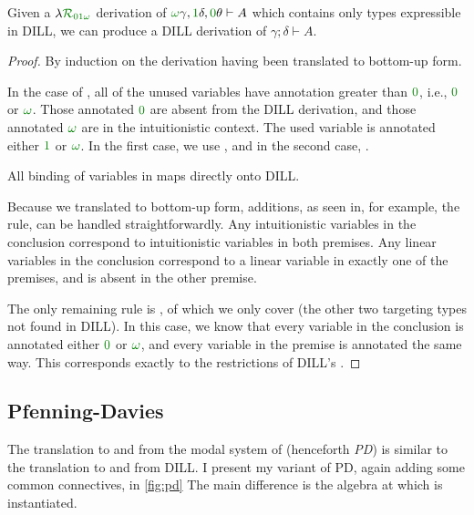 \begin{proposition}
  Given a $\name_{\instDILL}$ derivation of
  $\gr\omega\gamma, \gr1\delta,
  \gr0\theta \vdash A$ which contains only types expressible
  in DILL, we can produce a DILL derivation of $\gamma; \delta \vdash A$.
\end{proposition}
\begin{proof}
  By induction on the derivation having been translated to bottom-up form.

  In the case of , all of the unused variables have annotation
  greater than $\gr0$, i.e., $\gr0$ or $\gr\omega$.
  Those annotated $\gr0$ are absent from the DILL derivation, and those
  annotated $\gr\omega$ are in the intuitionistic context.
  The used variable is annotated either $\gr1$ or $\gr\omega$.
  In the first case, we use , and in the second case,
  .

  All binding of variables in \name{} maps directly onto DILL\@.

  Because we translated to bottom-up form, additions, as seen in, for example,
  the  rule, can be handled straightforwardly.
  Any intuitionistic variables in the conclusion correspond to intuitionistic
  variables in both premises.
  Any linear variables in the conclusion correspond to a linear variable in
  exactly one of the premises, and is absent in the other premise.

  The only remaining rule is , of which we only cover
   (the other two targeting types not found
  in DILL).
  In this case, we know that every variable in the conclusion is annotated
  either $\gr0$ or $\gr\omega$, and every variable in the premise is
  annotated the same way.
  This corresponds exactly to the restrictions of DILL's .
\end{proof}

\subsection{Pfenning-Davies}\label{sec:trans-pd}

The translation to and from the modal system of \citet{judgmental}
(henceforth \emph{PD}) is similar to the translation to and from DILL\@.
I present my variant of PD, again adding some common connectives, in
\cref{fig:pd}
The main difference is the algebra at which \name{} is instantiated.

